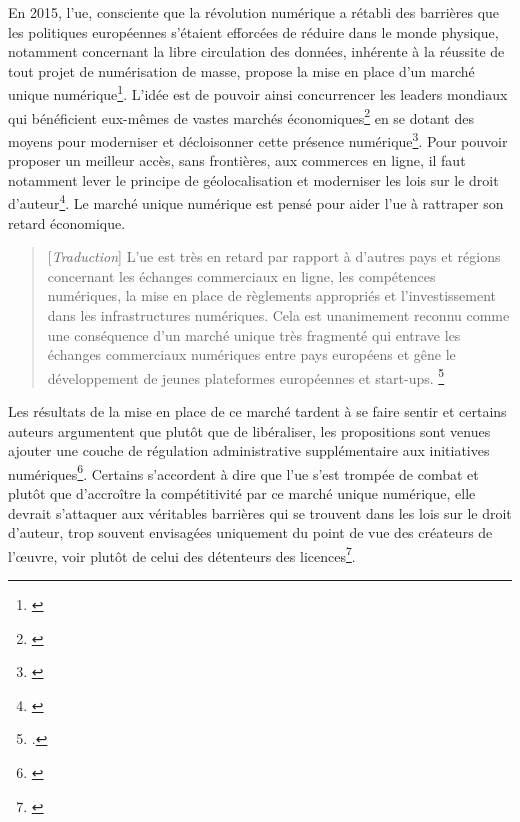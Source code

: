 En 2015, l'\gls{ue}, consciente que la révolution numérique a rétabli des barrières que les politiques européennes s'étaient efforcées de réduire dans le monde physique, notamment concernant la libre circulation des données, inhérente à la réussite de tout projet de numérisation de masse, propose la mise en place d'un marché unique numérique\footnote{\cite{hoekstra_proposed_2019}}. L'idée est de pouvoir ainsi concurrencer les leaders mondiaux qui bénéficient eux-mêmes de vastes marchés économiques\footnote{\cite[p.3]{viola_vers_2017}} en se dotant des moyens pour moderniser et décloisonner cette présence numérique\footnote{\cite{viola_vers_2017}}. Pour pouvoir proposer un meilleur accès, sans frontières, aux commerces en ligne, il faut notamment lever le principe de géolocalisation et moderniser les lois sur le droit d'auteur\footnote{\cite{noauthor_eu_2015}}. Le marché unique numérique est pensé pour aider l'\gls{ue} à rattraper son retard économique.

\begin{quotation}
[\textit{Traduction}]
L'\gls{ue} est très en retard par rapport à d'autres pays et régions concernant les échanges commerciaux en ligne, les compétences numériques, la mise en place de règlements appropriés et l'investissement dans les infrastructures numériques. Cela est unanimement reconnu comme une conséquence d'un marché unique très fragmenté qui entrave les échanges commerciaux numériques entre pays européens et gêne le développement de jeunes plateformes européennes et start-ups.
\footnote{\cite{dittrich_balancing_2017}.}
\end{quotation}

Les résultats de la mise en place de ce marché tardent à se faire sentir et certains auteurs argumentent que plutôt que de libéraliser, les propositions sont venues ajouter une couche de régulation administrative supplémentaire aux initiatives numériques\footnote{\cite{noauthor_next_nodate}}. Certains s'accordent à dire que l'\gls{ue} s'est trompée de combat et plutôt que d'accroître la compétitivité par ce marché unique numérique, elle devrait s'attaquer aux véritables barrières qui se trouvent dans les lois sur le droit d'auteur, trop souvent envisagées uniquement du point de vue des créateurs de l'\oe{}uvre, voir plutôt de celui des détenteurs des licences\footnote{\cite{schroff_politics_2018}}.


